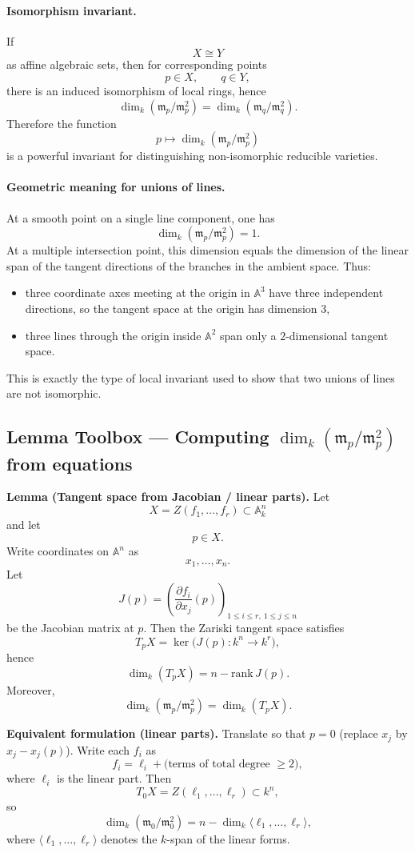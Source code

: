 \documentclass[12pt,a4paper]{article}
\theoremstyle{plain}
\theoremstyle{definition}      %
\begin{document}
\paragraph{Isomorphism invariant.}
If
\[
X \cong Y
\]
as affine algebraic sets, then for corresponding points
\[
p\in X,
\qquad
q\in Y,
\]
there is an induced isomorphism of local rings, hence
\[
\dim_k(\mathfrak m_p/\mathfrak m_p^2)
=
\dim_k(\mathfrak m_q/\mathfrak m_q^2).
\]
Therefore the function
\[
p \longmapsto \dim_k(\mathfrak m_p/\mathfrak m_p^2)
\]
is a powerful invariant for distinguishing non-isomorphic reducible varieties.

\paragraph{Geometric meaning for unions of lines.}
At a smooth point on a single line component, one has
\[
\dim_k(\mathfrak m_p/\mathfrak m_p^2)=1.
\]
At a multiple intersection point, this dimension equals the dimension of the linear span of the tangent directions of the branches in the ambient space.
Thus:
\begin{itemize}
	\item three coordinate axes meeting at the origin in $\mathbb{A}^3$ have three independent directions, so the tangent space at the origin has dimension $3$,
	\item three lines through the origin inside $\mathbb{A}^2$ span only a $2$-dimensional tangent space.
\end{itemize}
This is exactly the type of local invariant used to show that two unions of lines are not isomorphic.


\subsection*{Lemma Toolbox — Computing $\dim_k(\mathfrak m_p/\mathfrak m_p^2)$ from equations}

\textbf{Lemma (Tangent space from Jacobian / linear parts).}
Let
\[
X=Z(f_1,\dots,f_r)\subset \mathbb{A}^n_k
\]
and let
\[
p\in X.
\]
Write coordinates on $\mathbb{A}^n$ as
\[
x_1,\dots,x_n.
\]
Let
\[
J(p)=\left(\frac{\partial f_i}{\partial x_j}(p)\right)_{1\le i\le r,\ 1\le j\le n}
\]
be the Jacobian matrix at $p$.
Then the Zariski tangent space satisfies
\[
T_pX
=
\ker\!\bigl(J(p):k^n\to k^r\bigr),
\]
hence
\[
\dim_k(T_pX)
=
n-\mathrm{rank}\,J(p).
\]
Moreover,
\[
\dim_k(\mathfrak m_p/\mathfrak m_p^2)
=
\dim_k(T_pX).
\]

\textbf{Equivalent formulation (linear parts).}
Translate so that $p=0$ (replace $x_j$ by $x_j-x_j(p)$).
Write each $f_i$ as
\[
f_i
=
\ell_i
+
\text{(terms of total degree $\ge 2$)},
\]
where $\ell_i$ is the linear part.
Then
\[
T_0X=Z(\ell_1,\dots,\ell_r)\subset k^n,
\]
so
\[
\dim_k(\mathfrak m_0/\mathfrak m_0^2)
=
n-\dim_k\langle \ell_1,\dots,\ell_r\rangle,
\]
where $\langle \ell_1,\dots,\ell_r\rangle$ denotes the $k$-span of the linear forms.
\end{document}
